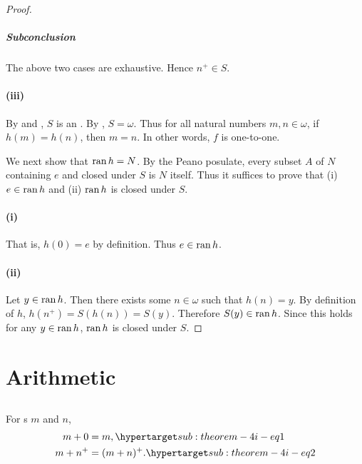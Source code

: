 \documentclass{report}
\begin{document}
\begin{proof}
      \subparagraph{Subconclusion}%

        The above two cases are exhaustive.
        Hence $n^+ \in S$.

    \paragraph{(iii)}%

      By  and , $S$ is an
        .
      By , $S = \omega$.
      Thus for all natural numbers $m, n \in \omega$, if $h(m) = h(n)$, then
        $m = n$.
      In other words, $f$ is one-to-one.
    \suitdivider

    \noindent
    We next show that $\mathop{\text{ran}}{h} = N$.
    By the Peano posulate, every subset $A$ of $N$ containing $e$ and closed under $S$ is $N$ itself.
    Thus it suffices to prove that (i) $e \in \mathop{\text{ran}}{h}$ and (ii) $\mathop{\text{ran}}{h}$ is closed under $S$.

    \paragraph{(i)}%

      That is, $h(0) = e$ by definition.
      Thus $e \in \mathop{\text{ran}}{h}$.

    \paragraph{(ii)}%

      Let $y \in \mathop{\text{ran}}{h}$.
      Then there exists some $n \in \omega$ such that $h(n) = y$.
      By definition of $h$, $h(n^+) = S(h(n)) = S(y)$.
      Therefore $S(y) \in \mathop{\text{ran}}{h}$.
      Since this holds for any $y \in \mathop{\text{ran}}{h}$, $\mathop{\text{ran}}{h}$ is closed under $S$.

  \end{proof}

\section{Arithmetic}%

\subsection{}

  \begin{theorem}[4I]
    For s $m$ and $n$,
      \begin{align}
        m + 0 & = m, \hyperlabel{sub:theorem-4i-eq1} \\
        m + n^+ & = (m + n)^+. \hyperlabel{sub:theorem-4i-eq2}
      \end{align}
  \end{theorem}
\end{document}
